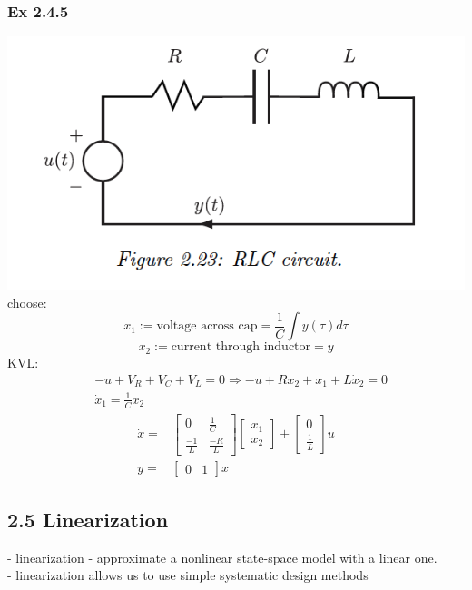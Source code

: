 \documentclass[letterpaper]{article}
\begin{document}
\subsubsection*{Ex 2.4.5}
\includegraphics[scale=0.9]{images/Ex2_4_5.png}\\
choose: $$x_1:=\text{voltage across cap}=\frac{1}{C}\int y(\tau)d\tau$$
$$x_2:=\text{current through inductor}=y$$
KVL:
\begin{align*}
    & -u+V_R+V_C+V_L=0\Rightarrow-u+Rx_2+x_1+L\dot x_2=0 \\
    & \dot x_1=\frac{1}{C}x_2                            
\end{align*}
\begin{align*}
  \dot x=&
  \begin{bmatrix}
  0&\frac{1}{C}\\
  \frac{-1}{L}&\frac{-R}{L}
  \end{bmatrix}
  \begin{bmatrix}
  x_1\\x_2
  \end{bmatrix}
  +\begin{bmatrix}
  0\\\frac{1}{L}
  \end{bmatrix}u\\
  y= & \begin{bmatrix} 0 & 1\end{bmatrix}x 
\end{align*}

\subsection*{2.5 Linearization}
- linearization - approximate a nonlinear state-space model with a linear one.\\
- linearization allows us to use simple systematic design methods\\
\end{document}
